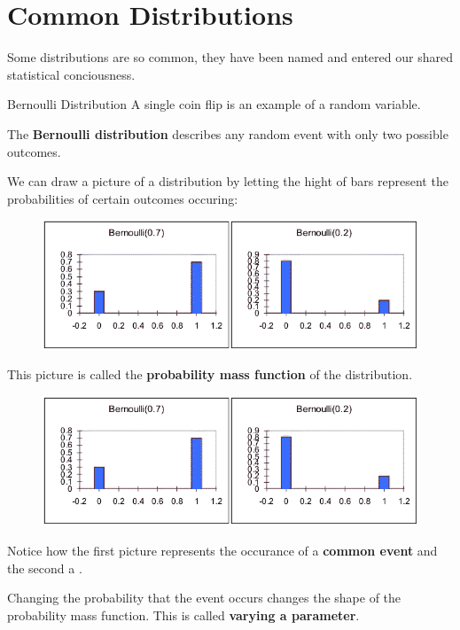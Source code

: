 \section{Common Distributions}

\begin{frame}
Some distributions are so common, they have been named and entered our shared
statistical conciousness.
\end{frame}
%

%
\begin{frame}{Bernoulli Distribution}
A single coin flip is an example of a  random
variable.

The \textbf{Bernoulli distribution} describes any random event with only two possible
outcomes.
\end{frame}
%

%
\begin{frame}

We can draw a picture of a distribution by letting the hight of bars represent
the probabilities of certain outcomes occuring:

  \begin{figure}
    \includegraphics[scale=0.40]{bernoulli}
  \end{figure}

This picture is called the \textbf{probability mass function} of the
distribution.
\end{frame}
%

%
\begin{frame}

  \begin{figure}
    \includegraphics[scale=0.40]{bernoulli}
  \end{figure}

Notice how the first picture represents the occurance of a \textbf{common event}
and the second a .

\hfill

Changing the probability that the event occurs changes the shape of the
probability mass function. This is called \textbf{varying a parameter}.

\end{frame}
%


